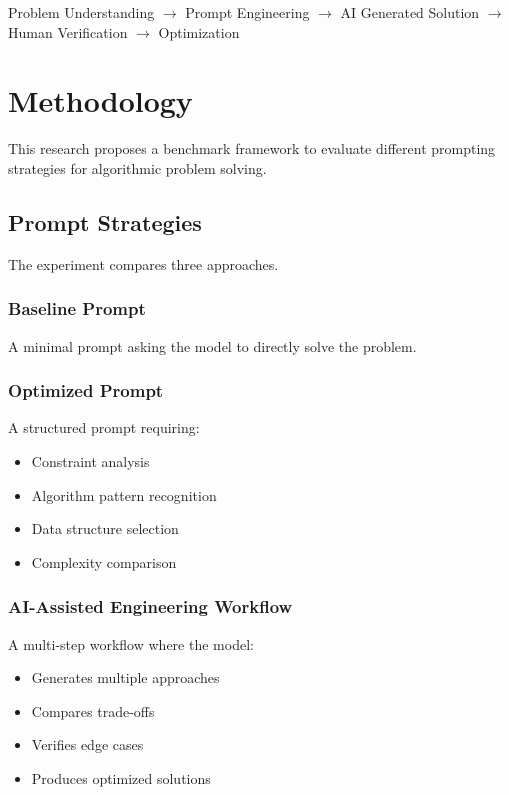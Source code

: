 \documentclass[11pt,a4paper]{article}
\begin{document}
\begin{center}

Problem Understanding
$\rightarrow$
Prompt Engineering
$\rightarrow$
AI Generated Solution
$\rightarrow$
Human Verification
$\rightarrow$
Optimization

\end{center}





\section{Methodology}

This research proposes a benchmark framework to evaluate different prompting
strategies for algorithmic problem solving.


\subsection{Prompt Strategies}

The experiment compares three approaches.

\subsubsection{Baseline Prompt}

A minimal prompt asking the model to directly solve the problem.

\subsubsection{Optimized Prompt}

A structured prompt requiring:

\begin{itemize}
\item Constraint analysis
\item Algorithm pattern recognition
\item Data structure selection
\item Complexity comparison
\end{itemize}

\subsubsection{AI-Assisted Engineering Workflow}

A multi-step workflow where the model:

\begin{itemize}
\item Generates multiple approaches
\item Compares trade-offs
\item Verifies edge cases
\item Produces optimized solutions
\end{itemize}
\end{document}
